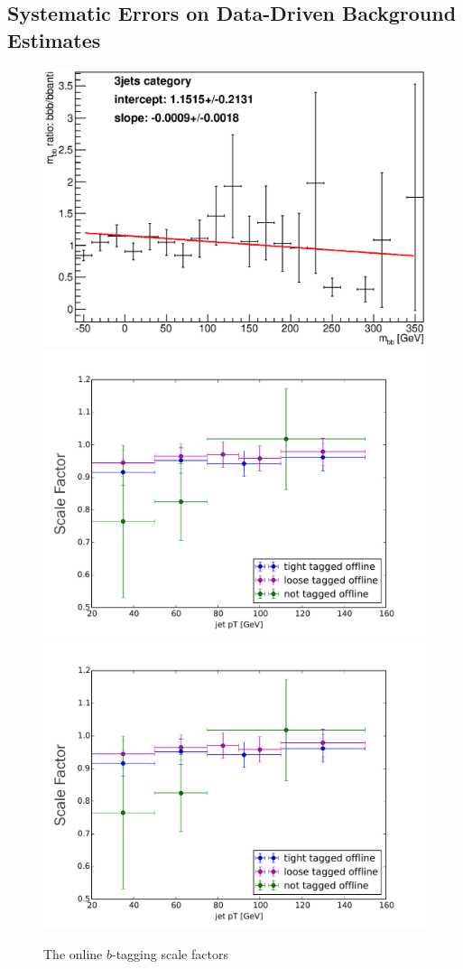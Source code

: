 \subsection{Systematic Errors on Data-Driven Background Estimates}
\begin{figure}
    \center
  \includegraphics[width=0.3\linewidth]{Systematics/shape_check_mbb_bbb_3jets_rotated.eps}
  \includegraphics[width=0.3\linewidth]{Systematics/online_SFs.pdf}
  \includegraphics[width=0.3\linewidth]{Systematics/online_SFs.pdf}
  \caption{The online $b$-tagging scale factors\label{fig:online_sfs}}    
\end{figure}                                                                                                                        






